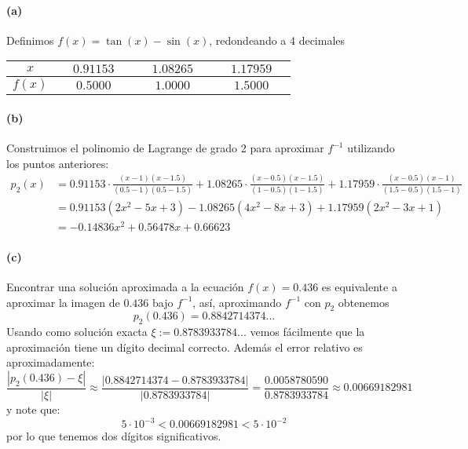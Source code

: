 \paragraph{(a)}
Definimos $f(x)=\tan(x)-\sin(x)$, redondeando a 4 decimales
	\begin{footnotesize}
	\begin{center}\begin{tabular}{|c||c|c|c|}\hline
			$x$    & $\quad{}0.91153\quad{}$& $\quad{}1.08265\quad{}$ & $\quad{}1.17959\quad{}$\\ \hline
			$f(x)$ &$0.5000$ &$1.0000$ &$1.5000$ \\ \hline
	\end{tabular}\end{center}
\end{footnotesize}
\paragraph{(b)}
Construimos el polinomio de Lagrange de grado 2 para aproximar $f^{-1}$ utilizando los puntos anteriores:
\begin{align*}
p_2(x)&=0.91153\cdot\frac{(x-1)(x-1.5)}{(0.5-1)(0.5-1.5)}+1.08265\cdot\frac{(x-0.5)(x-1.5)}{(1-0.5)(1-1.5)}+1.17959\cdot\frac{(x-0.5)(x-1)}{(1.5-0.5)(1.5-1)}\\
&= 0.91153(2x^2-5x+3)-1.08265(4x^2-8x+3)+1.17959(2x^2-3x+1)\\
&=-0.14836x^2+0.56478x+0.66623
\end{align*}
\paragraph{(c)}
Encontrar una soluci\'on aproximada a la ecuaci\'on $f(x)=0.436$ es equivalente a aproximar la imagen de $0.436$ bajo $f^{-1}$, as\'i, aproximando $f^{-1}$ con $p_2$ obtenemos
$$p_2(0.436)=0.8842714374...$$
Usando como soluci\'on exacta $\xi:=0.8783933784...$ vemos f\'acilmente que la aproximaci\'on tiene un d\'igito decimal correcto. Adem\'as el error relativo es aproximadamente:
$$\frac{|p_2(0.436)-\xi|}{|\xi|}\approx\frac{|0.8842714374-0.8783933784|}{|0.8783933784|}=\frac{0.0058780590}{0.8783933784}\approx0.00669182981$$
y note que:
$$5\cdot10^{-3}<0.00669182981<5\cdot 10^{-2}$$
por lo que tenemos dos d\'igitos significativos.
